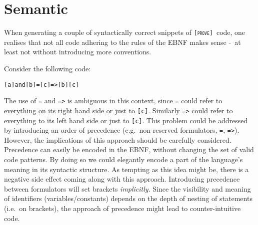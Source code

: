\documentclass[british]{article}
\newcommand\prv{bc}
\newcommand\m[1]{\texttt{#1}}
\newcommand\name{\texttt{\textsc{[prove]}}}
\begin{document}

\section{Semantic}

When generating a couple of syntactically correct snippets of \name\ code, one
realises that not all code adhering to the rules of the EBNF makes sense -\ at
least not without introducing more conventions.

\medskip{}

Consider the following code:

\begin{verbatim}
[a]and[b]=[c]=>[b][c]
\end{verbatim}

The use of \m{=} and \m{=>} is ambiguous in this context, since \m{=} could
refer to everything on its right hand side or just to \m{[c]}. Similarly \m{=>}
could refer to everything to its left hand side or just to \m{[c]}. This problem
could be addressed by introducing an order of precedence (e.g.\ non reserved
formulators, \m{=}, \m{=>}). However, the implications of this approach should
be carefully considered. Precedence can easily be encoded in the EBNF, without
changing the set of valid code patterns. By doing so we could elegantly encode a
part of the language's meaning in its syntactic structure. As tempting as this
idea might be, there is a negative side effect coming along with this approach.
Introducing precedence between formulators will set brackets \emph{implicitly}.
Since the visibility and meaning of identifiers (variables/constants) depends on
the depth of nesting of statements (i.e.\ on brackets), the approach of
precedence might lead to counter-intuitive code.\newline 
\end{document}
